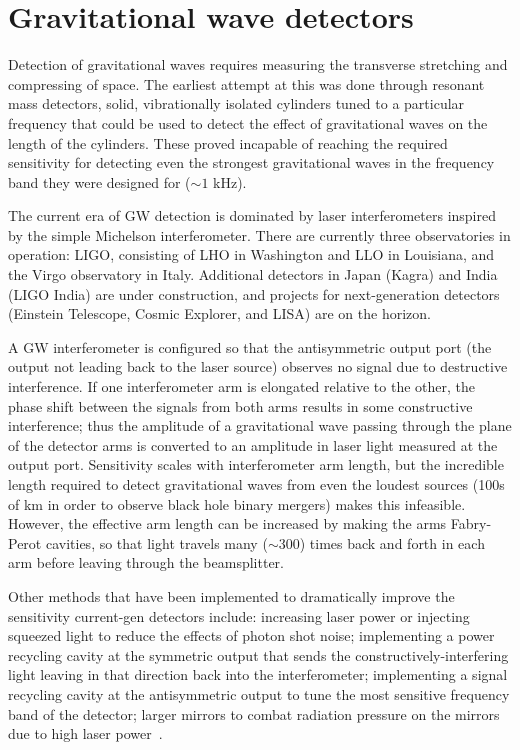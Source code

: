\chapter{Gravitational wave detectors}

Detection of gravitational waves requires measuring the transverse stretching and compressing of space. The earliest attempt at this was done through resonant mass detectors, solid, vibrationally isolated cylinders tuned to a particular frequency that could be used to detect the effect of gravitational waves on the length of the cylinders. These proved incapable of reaching the required sensitivity for detecting even the strongest gravitational waves in the frequency band they were designed for ($\sim1$ kHz).

The current era of \ac{GW} detection is dominated by laser interferometers inspired by the simple Michelson interferometer. There are currently three observatories in operation: \ac{LIGO}, consisting of \ac{LHO} in Washington and \ac{LLO} in Louisiana, and the Virgo observatory in Italy. Additional detectors in Japan (Kagra) and India (\ac{LIGO} India) are under construction, and projects for next-generation detectors (Einstein Telescope, Cosmic Explorer, and \ac{LISA}) are on the horizon.

A \ac{GW} interferometer is configured so that the antisymmetric output port (the output not leading back to the laser source) observes no signal due to destructive interference. If one interferometer arm is elongated relative to the other, the phase shift between the signals from both arms results in some constructive interference; thus the amplitude of a gravitational wave passing through the plane of the detector arms is converted to an amplitude in laser light measured at the output port. Sensitivity scales with interferometer arm length, but the incredible length required to detect gravitational waves from even the loudest sources (100s of km in order to observe black hole binary mergers) makes this infeasible. However, the effective arm length can be increased by making the arms Fabry-Perot cavities, so that light travels many ($\sim300$) times back and forth in each arm before leaving through the beamsplitter.

Other methods that have been implemented to dramatically improve the sensitivity current-gen detectors include: increasing laser power or injecting squeezed light to reduce the effects of photon shot noise; implementing a power recycling cavity at the symmetric output that sends the constructively-interfering light leaving in that direction back into the interferometer; implementing a signal recycling cavity at the antisymmetric output to tune the most sensitive frequency band of the detector; larger mirrors to combat radiation pressure on the mirrors due to high laser power~\citep{Creighton_2011}.

